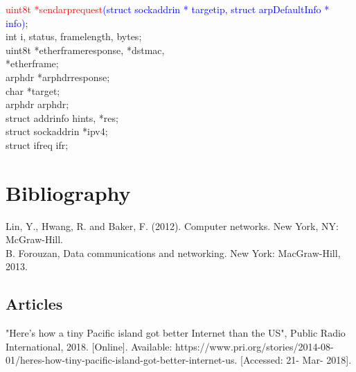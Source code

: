 \documentclass{uathesis}
\begin{document}
\begin{appendices}
\noindent\textcolor{red}{uint8\textunderscore t *send\textunderscore arp\textunderscore request}\textcolor{blue}{(struct sockaddr\textunderscore in * target\textunderscore ip, struct arpDefaultInfo * info)};\\

\noindent int i, status, frame\textunderscore length, bytes;\\
uint8\textunderscore t *ether\textunderscore frame\textunderscore response, *dst\textunderscore mac,\\ *ether\textunderscore frame;\\
arp\textunderscore hdr *arphdr\textunderscore response;\\
char *target; \\
arp\textunderscore hdr arphdr;\\
struct addrinfo hints, *res;\\
struct sockaddr\textunderscore in *ipv4;\\
struct ifreq ifr;
\end{appendices}


\chapter*{Bibliography}
 Lin, Y., Hwang, R. and Baker, F. (2012). Computer networks. New York, NY: McGraw-Hill. \\

\noindent [2] [8]B. Forouzan, Data communications and networking. New York: MacGraw-Hill, 2013.

\section*{Articles}

\noindent [3]"Here's how a tiny Pacific island got better Internet than the US", Public Radio International, 2018. [Online]. Available: https://www.pri.org/stories/2014-08-01/heres-how-tiny-pacific-island-got-better-internet-us. [Accessed: 21- Mar- 2018].\\
\end{document}

